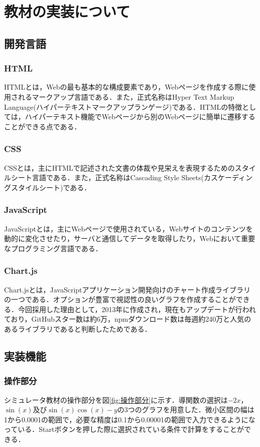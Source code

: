 \documentclass[a4paper, 12pt]{ltjsarticle}
\begin{document}
\section{教材の実装について}
\subsection{開発言語}
\subsubsection{HTML}
HTMLとは，Webの最も基本的な構成要素であり，Webページを作成する際に使用されるマークアップ言語である．また，正式名称はHyper Text Markup Language(ハイパーテキストマークアップランゲージ)である．HTMLの特徴としては，ハイパーテキスト機能でWebページから別のWebページに簡単に遷移することができる点である．
\subsubsection{CSS}
CSSとは，主にHTMLで記述された文書の体裁や見栄えを表現するためのスタイルシート言語である．また，正式名称はCascading Style Sheets(カスケーディングスタイルシート)である．
\subsubsection{JavaScript}
JavaScriptとは，主にWebページで使用されている，Webサイトのコンテンツを動的に変化させたり，サーバと通信してデータを取得したり，Webにおいて重要なプログラミング言語である．
\subsubsection{Chart.js}
Chart.jsとは，JavaScriptアプリケーション開発向けのチャート作成ライブラリの一つである．オプションが豊富で視認性の良いグラフを作成することができる．今回採用した理由として，2013年に作成され，現在もアップデートが行われており，GitHubスター数は約6万，npmダウンロード数は毎週約240万と人気のあるライブラリであると判断したためである．
\clearpage
\subsection{実装機能}
\subsubsection{操作部分}
シミュレータ教材の操作部分を図\ref{fig:操作部分}に示す．導関数の選択は$-2x$，$\sin(x)$及び$\sin(x)\cos(x)-y$の3つのグラフを用意した．微小区間の幅は1から0.0001の範囲で，必要な精度は0.1から0.00001の範囲で入力できるようになっている．Startボタンを押した際に選択されている条件で計算をすることができる．
\end{document}
